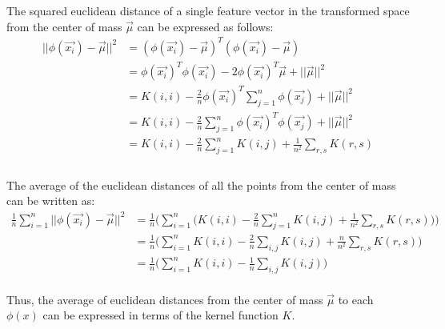 \documentclass{article}
\begin{document}
The squared euclidean distance of a single feature vector in the transformed space from the center of mass $\vec{\mu}$ can be expressed as follows:
\\
\begin{equation*}
\begin{split}
||\phi(\vec{x_{i}}) - \vec{\mu}||^2 &= (\phi(\vec{x_{i}}) - \vec{\mu})^T(\phi(\vec{x_{i}}) - \vec{\mu}) \\
&= \phi(\vec{x_{i}})^T\phi(\vec{x_{i}}) - 2\phi(\vec{x_{i}})^T\vec{\mu} + ||\vec{\mu}||^2 \\
&= K(i,i) - \frac{2}{n}\phi(\vec{x_{i}})^T \sum_{j=1}^{n} \phi(\vec{x_{j}}) + || \vec{\mu}||^2 \\
&= K(i,i) - \frac{2}{n} \sum_{j=1}^{n} \phi(\vec{x_{i}})^T \phi(\vec{x_{j}}) + || \vec{\mu}||^2 \\
&= K(i,i) - \frac{2}{n} \sum_{j=1}^{n} K(i,j) + \frac{1}{n^2}\sum_{r,s} K(r,s) \\
\end{split}
\end{equation*}
\\
The average of the euclidean distances of all the points from the center of mass can be written as:
\\
\begin{equation*}
\begin{split}
\frac{1}{n} \sum_{i=1}^{n} ||\phi(\vec{x_{i}})-\vec{\mu}||^2 &= \frac{1}{n} \Bigg(\sum_{i=1}^{n} \bigg( K(i,i) - \frac{2}{n} \sum_{j=1}^{n} K(i,j) + \frac{1}{n^2} \sum_{r,s} K(r,s) \bigg) \Bigg)  \\
&= \frac{1}{n}\bigg( \sum_{i=1}^{n} K(i,i) - \frac{2}{n} \sum_{i,j} K(i,j) +\frac{n}{n^2} \sum_{r,s} K(r,s) \bigg) \\
&= \frac{1}{n} \bigg( \sum_{i=1}^{n} K(i,i) - \frac{1}{n} \sum_{i,j} K(i,j) \bigg) 
\end{split}
\end{equation*}
\\
Thus, the average of euclidean distances from the center of mass $\vec{\mu}$ to each $\phi(x)$ can be expressed in terms of the kernel function $K$.
\end{document}
